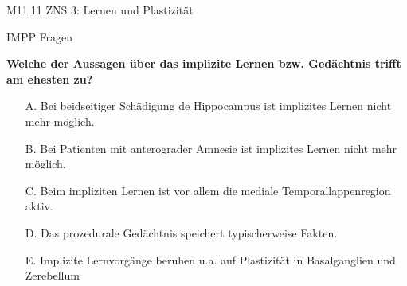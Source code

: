 \documentclass{beamer}
\begin{document}

















\begin{frame}{M11.11 ZNS 3: Lernen und Plastizität} 

\end{frame}



\begin{frame}{IMPP Fragen}

\textbf{Welche der Aussagen über das implizite Lernen bzw. Gedächtnis trifft am ehesten zu?} \\[0.2 cm]

\begin{itemize}
\item[A.] Bei beidseitiger Schädigung de Hippocampus ist implizites Lernen nicht mehr möglich.
\item[B.] Bei Patienten mit anterograder Amnesie ist implizites Lernen nicht mehr möglich.
\item[C.] Beim impliziten Lernen ist vor allem die mediale Temporallappenregion aktiv.
\item[D.] Das prozedurale Gedächtnis speichert typischerweise Fakten.
\item[E.] Implizite Lernvorgänge beruhen u.a. auf Plastizität in Basalganglien und Zerebellum %

\end{itemize}

\end{frame}
\end{document}
